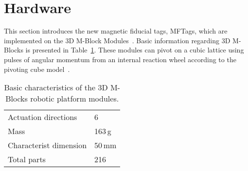 \section{Hardware}
\label{sec:Hardware}

This section introduces the new magnetic fiducial tags,  MFTags, which are implemented on the 3D M-Block Modules~\cite{Romanishin20153d}. Basic information regarding 3D M-Blocks is presented in Table~\ref{tab:hardwareOverviewTable}. These modules can pivot on a cubic lattice using pulses of angular momentum from an internal reaction wheel according to the pivoting cube model~\cite{RomanishinRus-IROS13}.
\begin{table}[h]
	\caption{Basic characteristics of the 3D M-Blocks robotic platform modules.}
	\centering
	\begin{tabular}{ p{3.5cm}  p{2cm} }
		\hline
		Actuation directions & 6 \\
		Mass  & 163\,g \\
		Characterist dimension & 50\,mm \\
		Total parts  & 216 \\
	\end{tabular}
	\label{tab:hardwareOverviewTable}
\end{table}

